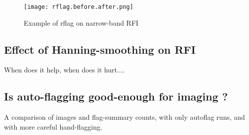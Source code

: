 \begin{figure}
\texttt{[image: rflag.before.after.png]}
\caption{Example of rflag on narrow-band RFI}
\end{figure}



\subsection{Effect of Hanning-smoothing on RFI}
When does it help, when does it hurt.... 

\subsection{Is auto-flagging good-enough for imaging ?}
A comparison of images and flag-summary counts,  with only autoflag runs, and with more careful hand-flagging. 





